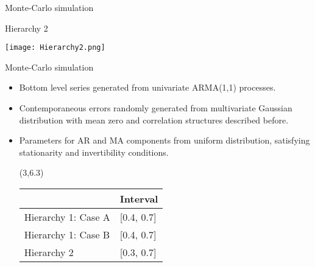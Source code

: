 \documentclass[14pt]{beamer}
\begin{document}
\begin{frame}{Monte-Carlo simulation}

\begin{block}{Hierarchy 2}
\centerline{\texttt{[image: Hierarchy2.png]}}
\end{block}

\end{frame}
\begin{frame}{Monte-Carlo simulation}
\begin{itemize}
  \item Bottom level series generated from univariate ARMA(1,1) processes.
  \item Contemporaneous errors randomly generated from multivariate Gaussian distribution with mean zero and correlation structures described before.
  \item Parameters for AR and MA components from uniform distribution, satisfying  stationarity and invertibility conditions.
  \begin{textblock}{6}(3,6.3)
\begin{block}{}
\centering\fontsize{11}{11}\sf
\begin{tabular}{ll}
& Interval \\
\midrule
Hierarchy 1: Case A & [0.4, 0.7]\\
Hierarchy 1: Case B & [0.4, 0.7]\\
Hierarchy 2 & [0.3, 0.7]
\end{tabular}
\end{block}
\end{textblock}
\end{itemize}
\vspace*{10cm}
\end{frame}
\end{document}
